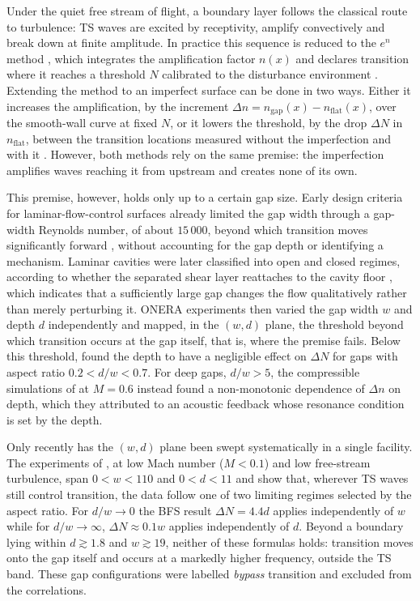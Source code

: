 \documentclass[lineno]{jfm}
\begin{document}
Under the quiet free stream of flight, a boundary layer follows the classical route to turbulence: \ac{TS} waves are excited by receptivity, amplify convectively and break down at finite amplitude. In practice this sequence is reduced to the $e^{n}$ method \citep{smithgamberoni,vanIngen1956}, which integrates the amplification factor $n(x)$ and declares transition where it reaches a threshold $N$ calibrated to the disturbance environment \citep{crouchNgKachanov2015}. Extending the method to an imperfect surface can be done in two ways.  Either it increases the amplification, by the increment $\Delta n=n_\mathrm{gap}(x)-n_\mathrm{flat}(x)$, over the smooth-wall curve at fixed $N$, or it lowers the threshold, by the drop $\Delta N$ in $n_\mathrm{flat}$, between the transition locations measured without the imperfection and with it \citep{crouchKosoryginNg2006,perraudArnalKuehn2014,crouch2021predicting}. However, both methods rely on the same premise: the imperfection amplifies waves reaching it from upstream and creates none of its own.

This premise, however, holds only up to a certain gap size. Early design criteria for laminar-flow-control surfaces already limited the gap width through a gap-width Reynolds number, of about $15\,000$, beyond which transition moves significantly forward \citep{nenniGluyas1966}, without accounting for the gap depth or identifying a mechanism. Laminar cavities were later classified into open and closed regimes, according to whether the separated shear layer reattaches to the cavity floor \citep{sinhaGuptaOberai1982,Zhang2005,Crook2013}, which indicates that a sufficiently large gap changes the flow qualitatively rather than merely perturbing it. ONERA experiments \citep{oliveBlanchard1982,seraudie2010,gentili2012} then varied the gap width $w$ and depth $d$ independently and mapped, in the $(w,d)$ plane, the threshold beyond which transition occurs at the gap itself, that is, where the premise fails. Below this threshold, \citet{beguetONERA} found the depth to have a negligible effect on $\Delta N$ for gaps with aspect ratio $0.2<d/w<0.7$. For deep gaps, $d/w>5$, the compressible simulations of \citet{zahnRist} at $M=0.6$ instead found a non-monotonic dependence of $\Delta n$ on depth, which they attributed to an acoustic feedback whose resonance condition is set by the depth.

Only recently has the $(w,d)$ plane been swept systematically in a single facility. The experiments of \citet{jeffGaps}, at low Mach number ($M<0.1$) and low free-stream turbulence, span $0<w<110$ and $0<d<11$ and show that, wherever \ac{TS} waves still control transition, the data follow one of two limiting regimes selected by the aspect ratio. For $d/w\to 0$ the \ac{BFS} result $\Delta N=4.4d$ applies independently of $w$ while for $d/w\to\infty$, $\Delta N\approx0.1w$ applies independently of $d$. Beyond a boundary lying within $d\gtrsim1.8$ and $w\gtrsim19$, neither of these formulas holds: transition moves onto the gap itself and occurs at a markedly higher frequency, outside the \ac{TS} band. These gap configurations were labelled \emph{bypass} transition and excluded from the correlations.
\end{document}

